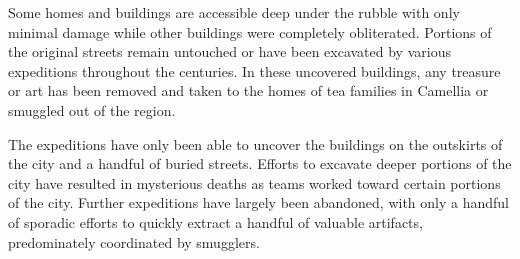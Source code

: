 Some homes and buildings are accessible deep under the rubble with only minimal damage while other buildings were completely obliterated.
Portions of the original streets remain untouched or have been excavated by various expeditions throughout the centuries.
In these uncovered buildings, any treasure or art has been removed and taken to the homes of tea families in Camellia or smuggled out of the region.

The expeditions have only been able to uncover the buildings on the outskirts of the city and a handful of buried streets.
Efforts to excavate deeper portions of the city have resulted in mysterious deaths as teams worked toward certain portions of the city.
Further expeditions have largely been abandoned, with only a handful of sporadic  efforts to quickly extract a handful of valuable artifacts, predominately coordinated by smugglers. 
